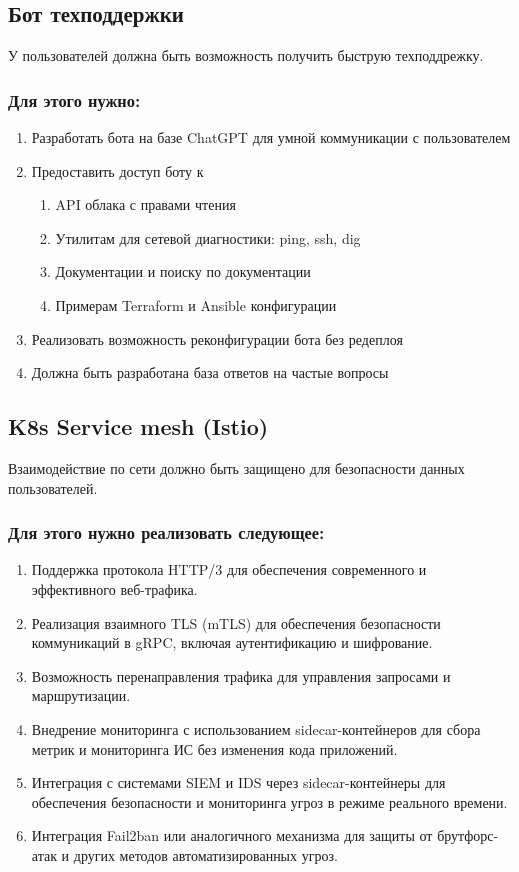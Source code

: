 \documentclass[14pt, a4paper]{extarticle}
\begin{document}
\subsection{Бот техподдержки}

У пользователей должна быть возможность получить быструю техподдрежку.

\subsubsection*{Для этого нужно:}

\begin{enumerate}
\item Разработать бота на базе ChatGPT для умной коммуникации с пользователем
\item Предоставить доступ боту к
\begin{enumerate}
\item API облака с правами чтения
\item Утилитам для сетевой диагностики: ping, ssh, dig
\item Документации и поиску по документации
\item Примерам Terraform и Ansible конфигурации
\end{enumerate}
\item Реализовать возможность реконфигурации бота без редеплоя
\item Должна быть разработана база ответов на частые вопросы
\end{enumerate}

\subsection{K8s Service mesh (Istio)}

Взаимодействие по сети должно быть защищено для безопасности данных пользователей.

\subsubsection*{Для этого нужно реализовать следующее:}

\begin{enumerate}
\item Поддержка протокола HTTP/3 для обеспечения современного и эффективного веб-трафика.
\item Реализация взаимного TLS (mTLS) для обеспечения безопасности коммуникаций в gRPC, включая аутентификацию и шифрование.
\item Возможность перенаправления трафика для управления запросами и маршрутизации.
\item Внедрение мониторинга с использованием sidecar-контейнеров для сбора метрик и мониторинга ИС без изменения кода приложений.
\item Интеграция с системами SIEM и IDS через sidecar-контейнеры для обеспечения безопасности и мониторинга угроз в режиме реального времени.
\item Интеграция Fail2ban или аналогичного механизма для защиты от брутфорс-атак и других методов автоматизированных угроз.
\end{enumerate}
\end{document}
